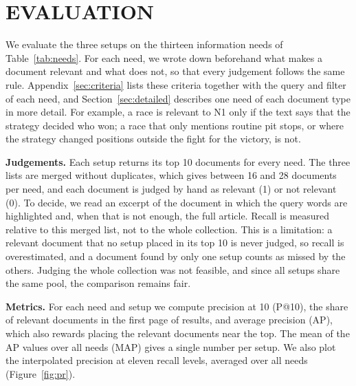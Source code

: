 \documentclass[sigconf]{acmart}
\begin{document}
\section{EVALUATION}
\label{sec:evaluation}
We evaluate the three setups on the thirteen information needs of
Table~\ref{tab:needs}. For each need, we wrote down beforehand what makes a
document relevant and what does not, so that every judgement follows the
same rule. Appendix~\ref{sec:criteria} lists these criteria together with
the query and filter of each need, and Section~\ref{sec:detailed} describes
one need of each document type in more detail. For example, a race is relevant to N1 only
if the text says that the strategy decided who won; a race that only mentions
routine pit stops, or where the strategy changed positions outside the fight
for the victory, is not.

\textbf{Judgements.} Each setup returns its top 10 documents for every need.
The three lists are merged without duplicates, which gives between 16 and 28
documents per need, and each document is judged by hand as relevant (1) or
not relevant (0). To decide, we read an excerpt of the document in which the
query words are highlighted and, when that is not enough, the full article.
Recall is measured relative to this merged list, not to the whole collection.
This is a limitation: a relevant document that no setup placed in its top 10
is never judged, so recall is overestimated, and a document found by only one
setup counts as missed by the others. Judging the whole collection was not
feasible, and since all setups share the same pool, the comparison remains
fair.

\textbf{Metrics.} For each need and setup we compute precision at 10 (P@10),
the share of relevant documents in the first page of results, and average
precision (AP), which also rewards placing the relevant documents near the
top. The mean of the AP values over all needs (MAP) gives a single number per
setup. We also plot the interpolated precision at eleven recall levels,
averaged over all needs (Figure~\ref{fig:pr}).
\end{document}
